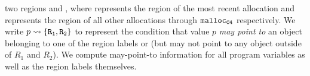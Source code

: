 two regions  and , where  represents the region of the most recent allocation and 
represents the region of all other allocations through ${\tt malloc_{C4}}$ respectively.
We write $p \rightsquigarrow{} \{{\tt R_1}, {\tt R_2}\}$ to represent the condition that value $p$ {\em may point to}
an object belonging to one of the region labels  or 
(but may not point to any object outside of $R_1$ and $R_2$). We compute may-point-to information for
all program variables as well as the region labels themselves.

